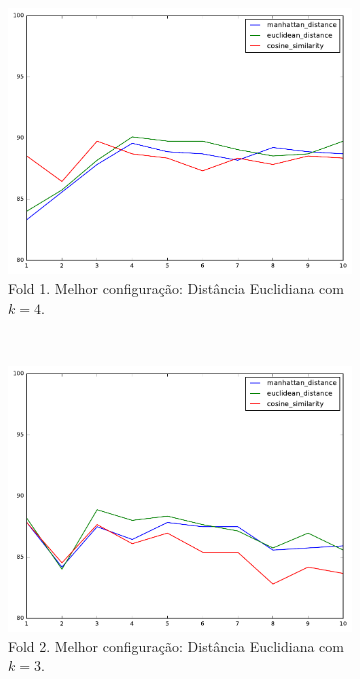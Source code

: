 \documentclass{article}
\begin{document}
\begin{figure}[t!]
	\centering
	\begin{subfigure}[t]{0.32\textwidth}
		\centering
		\includegraphics[width=\linewidth]{exercicio9-fold-1.pdf}
		\caption{Fold 1. Melhor configuração: Distância Euclidiana com $k=4$.}
	\end{subfigure}%
	~ 
	\begin{subfigure}[t]{0.32\textwidth}
		\centering
		\includegraphics[width=\linewidth]{exercicio9-fold-2.pdf}
		\caption{Fold 2. Melhor configuração: Distância Euclidiana com $k=3$.}
	\end{subfigure}
	~ 
	\begin{subfigure}[t]{0.32\textwidth}

\end{subfigure}
\end{figure}
\end{document}
